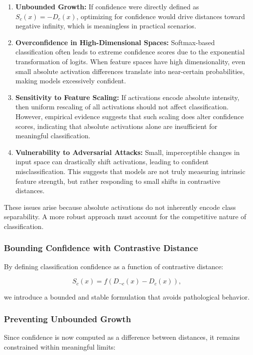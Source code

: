 \documentclass[12pt]{article}
\begin{document}
\begin{enumerate}
    \item \textbf{Unbounded Growth:} If confidence were directly defined as \( S_c(x) = -D_c(x) \), optimizing for confidence would drive distances toward negative infinity, which is meaningless in practical scenarios.
    \item \textbf{Overconfidence in High-Dimensional Spaces:} Softmax-based classification often leads to extreme confidence scores due to the exponential transformation of logits. When feature spaces have high dimensionality, even small absolute activation differences translate into near-certain probabilities, making models excessively confident.
    \item \textbf{Sensitivity to Feature Scaling:} If activations encode absolute intensity, then uniform rescaling of all activations should not affect classification. However, empirical evidence suggests that such scaling does alter confidence scores, indicating that absolute activations alone are insufficient for meaningful classification.
    \item \textbf{Vulnerability to Adversarial Attacks:} Small, imperceptible changes in input space can drastically shift activations, leading to confident misclassification. This suggests that models are not truly measuring intrinsic feature strength, but rather responding to small shifts in contrastive distances.
\end{enumerate}

These issues arise because absolute activations do not inherently encode class separability. A more robust approach must account for the competitive nature of classification.

\subsubsection{Bounding Confidence with Contrastive Distance}

By defining classification confidence as a function of contrastive distance:

\[
S_c(x) = f(D_{\neg c}(x) - D_c(x)),
\]

we introduce a bounded and stable formulation that avoids pathological behavior.

\subsubsection{Preventing Unbounded Growth}

Since confidence is now computed as a difference between distances, it remains constrained within meaningful limits:
\end{document}
